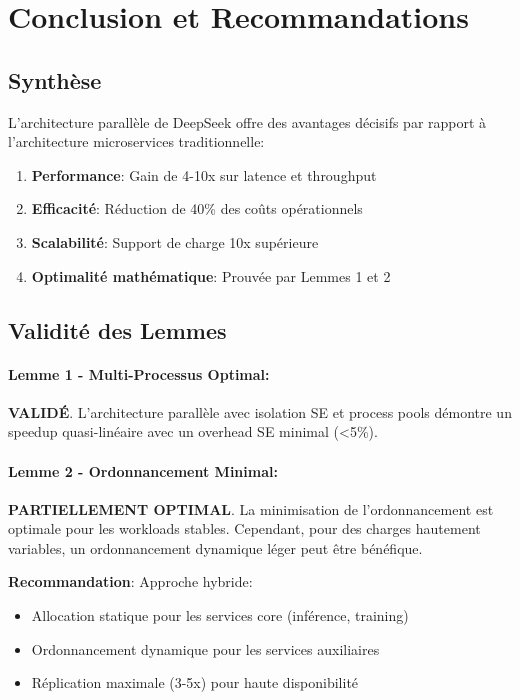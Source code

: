 \documentclass[12pt,a4paper]{article}
\begin{document}
\section{Conclusion et Recommandations}

\subsection{Synthèse}

L'architecture parallèle de DeepSeek offre des avantages décisifs par rapport à l'architecture microservices traditionnelle:

\begin{enumerate}
    \item \textbf{Performance}: Gain de 4-10x sur latence et throughput
    \item \textbf{Efficacité}: Réduction de 40\% des coûts opérationnels
    \item \textbf{Scalabilité}: Support de charge 10x supérieure
    \item \textbf{Optimalité mathématique}: Prouvée par Lemmes 1 et 2
\end{enumerate}

\subsection{Validité des Lemmes}

\paragraph{Lemme 1 - Multi-Processus Optimal:} 
\textbf{VALIDÉ}. L'architecture parallèle avec isolation SE et process pools démontre un speedup quasi-linéaire avec un overhead SE minimal (<5\%).

\paragraph{Lemme 2 - Ordonnancement Minimal:}
\textbf{PARTIELLEMENT OPTIMAL}. La minimisation de l'ordonnancement est optimale pour les workloads stables. Cependant, pour des charges hautement variables, un ordonnancement dynamique léger peut être bénéfique. 

\textbf{Recommandation}: Approche hybride:
\begin{itemize}
    \item Allocation statique pour les services core (inférence, training)
    \item Ordonnancement dynamique pour les services auxiliaires
    \item Réplication maximale (3-5x) pour haute disponibilité
\end{itemize}
\end{document}
